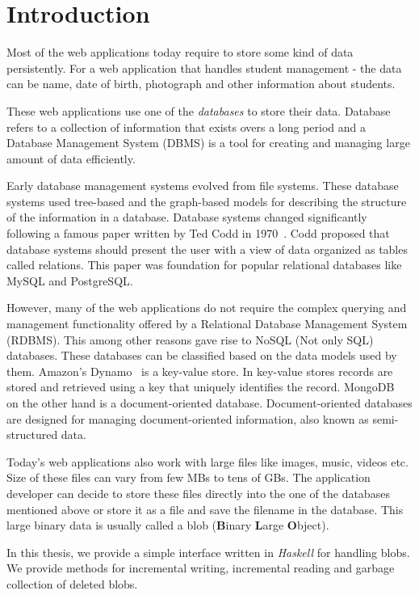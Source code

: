 \chapter{Introduction}
\label{chap:intro}

Most of the web applications today require to store some kind of data persistently. For a web application that handles student management - the data can be name, date of birth, photograph and other information about students.

These web applications use one of the \textit{databases} to store their data. Database refers to a collection of information that exists overs a long period and a Database Management System (DBMS) is a tool for creating and managing large amount of data efficiently.

Early database management systems evolved from file systems. These database systems used tree-based and the graph-based models for describing the structure of the information in a database. Database systems changed significantly following a famous paper written by Ted Codd in 1970~\cite{codd1970relational}. Codd proposed that database systems should present the user with a view of data organized as tables called relations. This paper was foundation for popular relational databases like MySQL and PostgreSQL.

However, many of the web applications do not require the complex querying and management functionality offered by a Relational Database Management System (RDBMS). This among other reasons gave rise to NoSQL (Not only SQL) databases. These databases can be classified based on the data models used by them. Amazon's Dynamo~\cite{decandia2007dynamo} is a key-value store. In key-value stores records are stored and retrieved using a key that uniquely identifies the record.
MongoDB~\cite{chodorow2013mongodb} on the other hand is a document-oriented database. Document-oriented databases are designed for managing document-oriented information, also known as semi-structured data.

Today's web applications also work with large files like images, music, videos etc. Size of these files can vary from few MBs to tens of GBs. The application developer can decide to store these files directly into the one of the databases mentioned above or store it as a file and save the filename in the database. This large binary data is usually called a blob (\textbf{B}inary \textbf{L}arge \textbf{O}bject).

In this thesis, we provide a simple interface written in \textit{Haskell} for handling blobs. We provide methods for incremental writing, incremental reading and garbage collection of deleted blobs.


